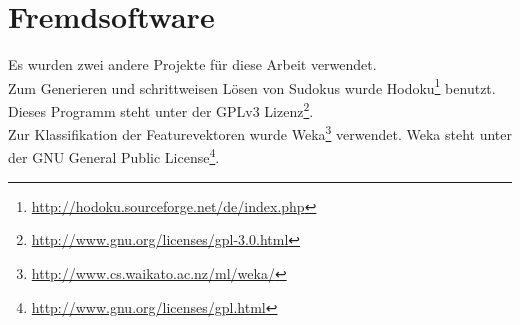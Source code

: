 \section{Fremdsoftware}
\label{Fremdsoftware}
Es wurden zwei andere Projekte für diese Arbeit verwendet.\\
Zum Generieren und schrittweisen Lösen von Sudokus wurde Hodoku\footnote{\url{http://hodoku.sourceforge.net/de/index.php}} benutzt. Dieses Programm steht unter der GPLv3 Lizenz\footnote{\url{http://www.gnu.org/licenses/gpl-3.0.html}}.\\
Zur Klassifikation der Featurevektoren wurde Weka\footnote{\url{http://www.cs.waikato.ac.nz/ml/weka/}} verwendet. Weka steht unter der GNU General Public License\footnote{\url{http://www.gnu.org/licenses/gpl.html}}.